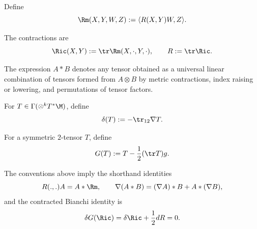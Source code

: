 \begin{definition}
\label{topping:notn-riemann-tensor}


Define
\[
\Rm(X,Y,W,Z):=\langle R(X,Y)W,Z\rangle.
\]
\end{definition}

\begin{definition}
\label{topping:notn-richi-tensor}


The contractions are
\[
\Ric(X,Y):=\tr\Rm(X,\cdot,Y,\cdot),\qquad R:=\tr\Ric.
\]
\end{definition}

\begin{definition}
\label{topping:notn-star-product}


The expression $A*B$ denotes any tensor obtained as a universal linear
combination of tensors formed from $A\otimes B$ by metric contractions, index
raising or lowering, and permutations of tensor factors.
\end{definition}

\begin{definition}[Divergence]
\label{topping:notn-divergence}


For $T\in\Gamma(\otimes^kT^*\M)$, define
\[
\delta(T):=-\tr_{12}\nabla T.
\]
\end{definition}

\begin{definition}
\label{topping:notn-gravitation-tensor}


For a symmetric $2$-tensor $T$, define
\[
G(T):=T-\frac12(\tr T)g.
\]
\end{definition}

\begin{remark}
\label{topping:notn-background-remark}

The conventions above imply the shorthand identities
\[
R(.,.)A=A*\Rm,\qquad
\nabla(A*B)=(\nabla A)*B+A*(\nabla B),
\]
and the contracted Bianchi identity is
\[
\delta G(\Ric)=\delta\Ric+\frac12dR=0.
\]
\end{remark}

